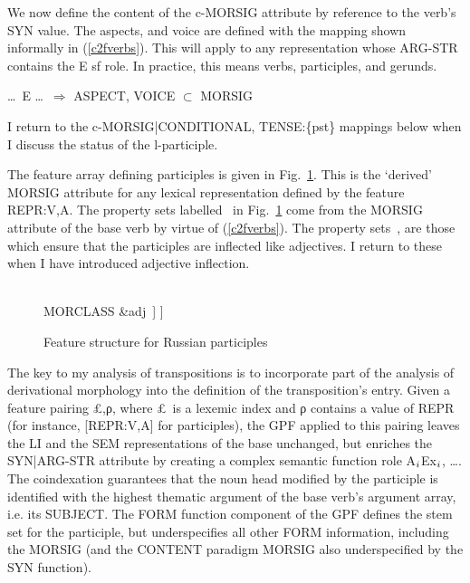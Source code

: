 \documentclass[output=paper,
modfonts
]{LSP/langsci}
\begin{document}
We now define the content of the c-MORSIG attribute by reference to the verb’s SYN value. The aspects, and voice are defined with the mapping shown informally in (\ref{c2fverbs}). This will apply to any representation whose ARG-STR contains the E sf role. In practice, this means verbs, participles, and gerunds.


\begin{exe}	\ex	\label{c2fverbs}

\ldots\ E \ldots\ $\Rightarrow$ ASPECT, VOICE $\subset$ MORSIG 
\end{exe}
I return to the c-MORSIG|CONDITIONAL, TENSE:\{pst\} mappings below when I discuss the status of the l-participle.


The  feature array defining participles is given in Fig.~\ref{fig:Russptcps}. This is the ‘derived’ MORSIG attribute for any lexical representation defined by the feature REPR:\lab V,A\rab. %
The property sets labelled \, in Fig.~\ref{fig:Russptcps} come from the MORSIG attribute of the base verb %
by virtue of (\ref{c2fverbs}). %
The property sets \,,  are those which ensure that the participles are inflected like adjectives. I return to these when I have introduced adjective inflection. 


\begin{figure}[h]
	\begin{center}
		\begin{avm}
[MORSIG  [
ASPECT		&\{ipfv, pfv\}\,\hpsgtag{1}
\\
VOICE		&\{act, pass\}\,\hpsgtag{2}\\

CONCORD &[NUMBER		&\{sg, pl\}\\
GENDER		&\{m, f, n\}\\
CASE			&\{nom, \ldots\}
		]\,\\
MORCLASS	&adj\,
]
]
		\end{avm}
\caption{Feature structure for  Russian participles} 	\label{fig:Russptcps} 
	\end{center}
\end{figure}

The key to my analysis of transpositions is to incorporate part of the analysis of derivational morphology into the definition of the transposition’s entry. Given a feature pairing \lab\pounds,ρ\rab, where \pounds\ is a lexemic index and ρ contains a value of REPR (for instance, [REPR:\lab V,A\rab] for participles), the GPF applied to this pairing leaves the LI and the SEM representations of the base unchanged, but enriches the SYN|ARG-STR attribute by creating a complex semantic function role \lab A$\sb{i}$\lab E\lab x$\sb{i}$, \ldots\rab\rab\rab. The coindexation guarantees that the noun head modified by the participle is identified with the highest thematic argument of the base verb’s argument array, i.e. its SUBJECT. %
The FORM function component of the GPF defines the stem set for the participle, but underspecifies all other FORM information, including the MORSIG (and the CONTENT paradigm MORSIG also underspecified by the SYN function). 
\end{document}
